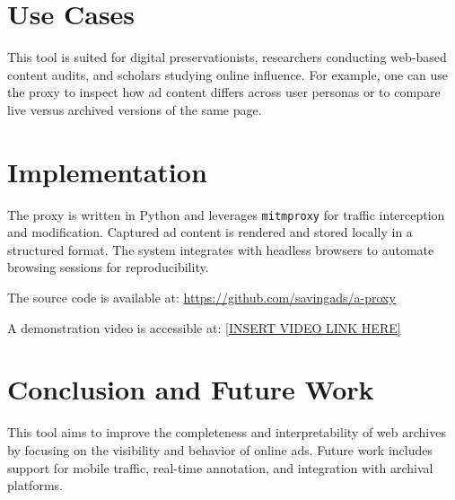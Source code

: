 \documentclass[sigconf]{acmart}
\begin{document}
\section{Use Cases}
This tool is suited for digital preservationists, researchers conducting web-based content audits, and scholars studying online influence. For example, one can use the proxy to inspect how ad content differs across user personas or to compare live versus archived versions of the same page.

\section{Implementation}
The proxy is written in Python and leverages \texttt{mitmproxy} for traffic interception and modification. Captured ad content is rendered and stored locally in a structured format. The system integrates with headless browsers to automate browsing sessions for reproducibility.

The source code is available at: \url{https://github.com/savingads/a-proxy}

A demonstration video is accessible at: \url{[INSERT VIDEO LINK HERE]}

\section{Conclusion and Future Work}
This tool aims to improve the completeness and interpretability of web archives by focusing on the visibility and behavior of online ads. Future work includes support for mobile traffic, real-time annotation, and integration with archival platforms.



\end{document}
